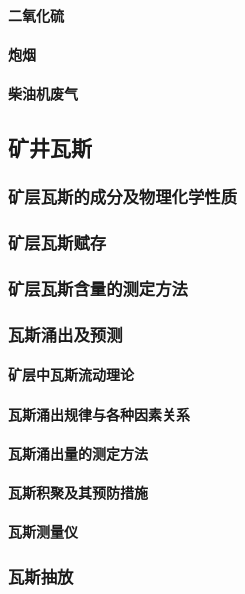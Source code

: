 \documentclass[UTF8]{../../ApplicationUniverse}
\begin{document}
            \paragraph{二氧化硫}
            \paragraph{炮烟}
            \paragraph{柴油机废气}
    \subsection{矿井瓦斯}
        \subsubsection{矿层瓦斯的成分及物理化学性质}
        \subsubsection{矿层瓦斯赋存}
        \subsubsection{矿层瓦斯含量的测定方法}
        \subsubsection{瓦斯涌出及预测}
            \paragraph{矿层中瓦斯流动理论}
            \paragraph{瓦斯涌出规律与各种因素关系}
            \paragraph{瓦斯涌出量的测定方法}
            \paragraph{瓦斯积聚及其预防措施}
            \paragraph{瓦斯测量仪}
        \subsubsection{瓦斯抽放}
\end{document}
